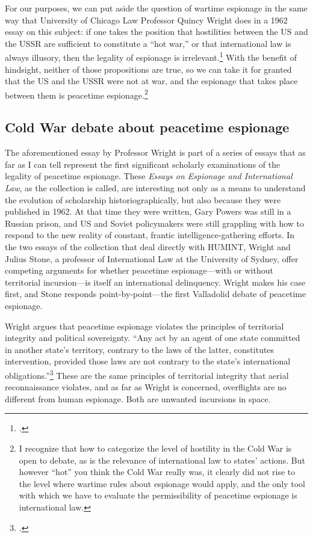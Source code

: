 \documentclass[12pt]{article}
\begin{document}
For our purposes, we can put aside the question of wartime espionage in the same way that University of Chicago Law Professor Quincy Wright does in a 1962 essay on this subject: if one takes the position that hostilities between the US and the USSR are sufficient to constitute a ``hot war,'' or that international law is always illusory, then the legality of espionage is irrelevant.\footcite[p.~8]{wright_espionage_1962} With the benefit of hindsight, neither of those propositions are true, so we can take it for granted that the US and the USSR were not at war, and the espionage that takes place between them is peacetime espionage.\footnote{I recognize that how to categorize the level of hostility in the Cold War is open to debate, as is the relevance of international law to states' actions. But however ``hot'' you think the Cold War really was, it clearly did not rise to the level where wartime rules about espionage would apply, and the only tool with which we have to evaluate the permissibility of peacetime espionage is international law.}

\subsection{Cold War debate about peacetime espionage}
The aforementioned essay by Professor Wright is part of a series of essays that as far as I can tell represent the first significant scholarly examinations of the legality of peacetime espionage. These \emph{Essays on Espionage and International Law}, as the collection is called, are interesting not only as a means to understand the evolution of scholarship historiographically, but also because they were published in 1962. At that time they were written, Gary Powers was still in a Russian prison, and US and Soviet policymakers were still grappling with how to respond to the new reality of constant, frantic intelligence-gathering efforts. In the two essays of the collection that deal directly with HUMINT, Wright and Julius Stone, a professor of International Law at the University of Sydney, offer competing arguments for whether peacetime espionage---with or without territorial incursion---is itself an international delinquency. Wright makes his case first, and Stone responds point-by-point---the first Valladolid debate of peacetime espionage.

Wright argues that peacetime espionage violates the principles of territorial integrity and political sovereignty. ``Any act by an agent of one state committed in another state's territory, contrary to the laws of the latter, constitutes intervention, provided those laws are not contrary to the state's international obligations.''\footcite[p.~13]{wright_espionage_1962} These are the same principles of territorial integrity that aerial reconnaissance violates, and as far as Wright is concerned, overflights are no different from human espionage. Both are unwanted incursions in space.
\end{document}
